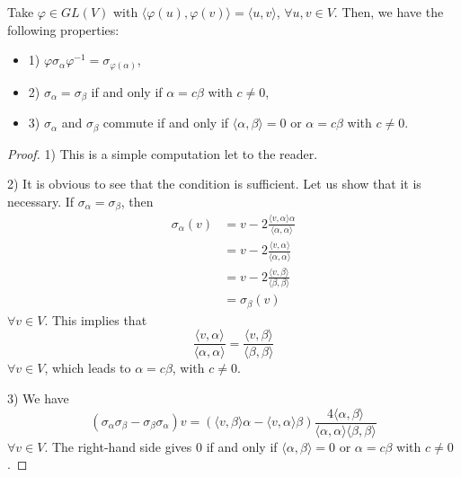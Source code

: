 
\begin{proposition}
Take $\varphi \in GL(V)$ with $\langle \varphi (u), \varphi (v) \rangle = \langle u, v \rangle$, $\forall u, v \in V$. Then, we have the following properties:
\begin{itemize}
\item 1) $\varphi \sigma_\alpha \varphi^{-1} = \sigma_{\varphi (\alpha) }$,
\item 2) $\sigma_\alpha = \sigma_\beta$ if and only if $\alpha = c \beta$ with $c \neq 0$,
\item 3) $\sigma_\alpha$ and $\sigma_\beta$ commute if and only if $\langle \alpha , \beta \rangle = 0$ or $\alpha = c \beta$ with $c\neq 0$.
\end{itemize}
\end{proposition}

\begin{proof}
1) This is a simple computation let to the reader.

2) It is obvious to see that the condition is sufficient. Let us show that it is necessary. If $\sigma_\alpha = \sigma_\beta$, then
\begin{equation}
\begin{split}
\sigma_\alpha (v) &= v  - 2\frac{ \langle v, \alpha \rangle \alpha}{\langle \alpha, \alpha \rangle} \\
&= v - 2 \frac{\langle v, \alpha \rangle}{\langle \alpha, \alpha \rangle} \\
&= v - 2 \frac{\langle v, \beta \rangle}{\langle \beta, \beta \rangle} \\
&= \sigma_\beta (v)
\end{split}
\end{equation} $\forall v \in V$. This implies that
\begin{equation}
\frac{\langle v, \alpha \rangle}{\langle \alpha, \alpha \rangle} = \frac{\langle v, \beta \rangle}{\langle \beta, \beta \rangle}
\end{equation} $\forall v \in V$, which leads to $\alpha = c\beta$, with $c\neq 0$.

3) We have
\begin{equation}
(\sigma_\alpha \sigma_\beta - \sigma_\beta \sigma_\alpha ) v =  ( \langle v , \beta \rangle \alpha - \langle v , \alpha \rangle \beta ) \frac{4 \langle \alpha, \beta \rangle}{\langle \alpha, \alpha \rangle \langle \beta , \beta \rangle}
\end{equation} $\forall v \in V$. The right-hand side gives $0$ if and only if $\langle \alpha , \beta \rangle = 0$ or $\alpha = c \beta$ with $c \neq 0$.

\end{proof}


